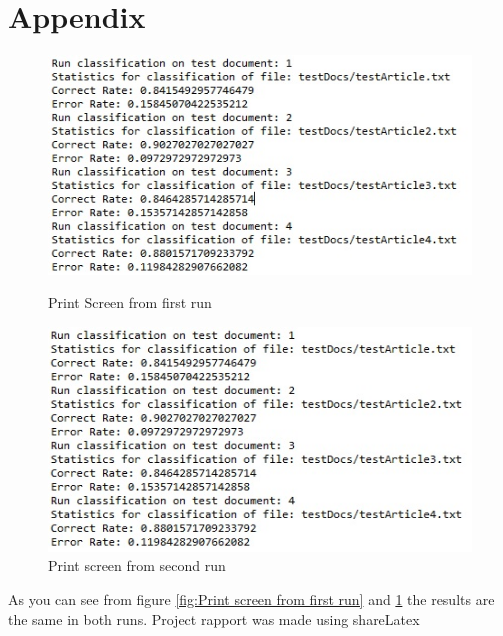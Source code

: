 \documentclass{article}
\begin{document}
\section{Appendix}
\begin{figure}[here]
\centering
\includegraphics{fig/firstRun.jpg}
\caption{Print Screen from first run}
\label{fig:Print screen from first run}
\includegraphics{fig/secondRun.jpg}
\caption{Print screen from second run}
\label{fig:Print screen from second run}
\end{figure}
As you can see from figure \ref{fig:Print screen from first run} and \ref{fig:Print screen from second run} the results are the same in both runs.
Project rapport was made using shareLatex
\end{document}

